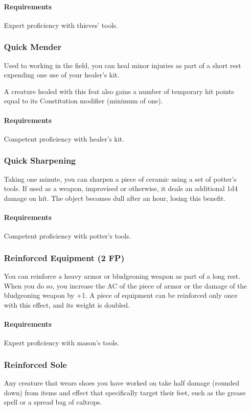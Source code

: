     \paragraph{Requirements} Expert proficiency with thieves' tools.
\subsubsection{Quick Mender} \label{feat::quickmender}
    Used to working in the field, you can heal minor injuries as part of a short rest expending one use of your healer's kit.

    A creature healed with this feat also gains a number of temporary hit points equal to its Constitution modifier (minimum of one).
    \paragraph{Requirements} Competent proficiency with healer's kit.
\subsubsection{Quick Sharpening} \label{feat::quicksharpening}
    Taking one minute, you can sharpen a piece of ceramic using a set of potter's tools.
    If used as a weapon, improvised or otherwise, it deals an additional 1d4 damage on hit.
    The object becomes dull after an hour, losing this benefit.
    \paragraph{Requirements} Competent proficiency with potter's tools.
\subsubsection{Reinforced Equipment (2 FP)} \label{feat::reinforcedequipment}
    You can reinforce a heavy armor or bludgeoning weapon as part of a long rest.
    When you do so, you increase the AC of the piece of armor or the damage of the bludgeoning weapon by +1.
    A piece of equipment can be reinforced only once with this effect, and its weight is doubled.
    \paragraph{Requirements} Expert proficiency with mason's tools.
\subsubsection{Reinforced Sole} \label{feat::reinforcedsole}
    Any creature that wears shoes you have worked on take half damage (rounded down) from items and effect that specifically target their feet, such as the grease spell or a spread bag of caltrops.

